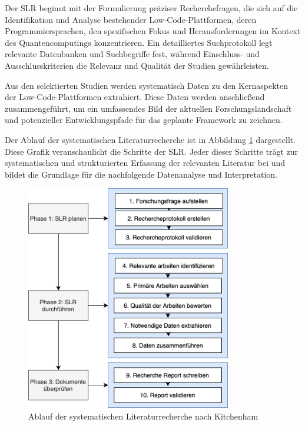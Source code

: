 Der SLR beginnt mit der Formulierung präziser Recherchefragen, die sich auf die 
Identifikation und Analyse bestehender Low-Code-Plattformen, deren Programmiersprachen, 
den spezifischen Fokus und Herausforderungen im Kontext des Quantencomputings 
konzentrieren. Ein detailliertes Suchprotokoll legt relevante Datenbanken und 
Suchbegriffe fest, während Einschluss- und Ausschlusskriterien die Relevanz und Qualität 
der Studien gewährleisten.

Aus den selektierten Studien werden systematisch Daten zu den Kernaspekten der 
Low-Code-Plattformen extrahiert. Diese Daten werden anschließend zusammengeführt, um ein 
umfassendes Bild der aktuellen Forschungslandschaft und potenzieller Entwicklungspfade für 
das geplante Framework zu zeichnen.

Der Ablauf der systematischen Literaturrecherche ist in Abbildung \ref{fig:slr_kitchenham} dargestellt. 
Diese Grafik veranschaulicht die Schritte der SLR. Jeder dieser Schritte trägt zur systematischen und 
strukturierten Erfassung der relevanten Literatur bei und bildet die Grundlage für die nachfolgende 
Datenanalyse und Interpretation.

\begin{figure}[h!]
    \centering
    \includegraphics[width=0.8\textwidth]{graphics/slr_kitchenham_ablauf.png}
    \caption{Ablauf der systematischen Literaturrecherche nach Kitchenham}
    \label{fig:slr_kitchenham}
\end{figure}

